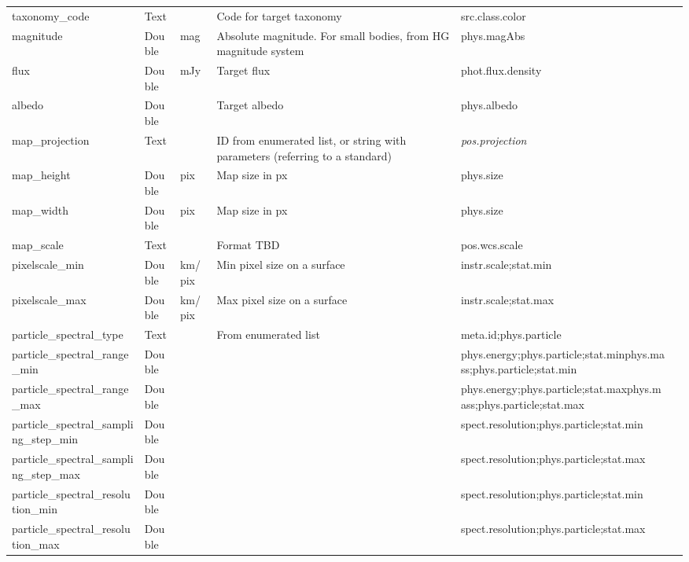 \documentclass[11pt,a4paper]{ivoa}
\begin{document}
\begin{landscape}
\begin{longtable}{p{3.5cm}p{0.5cm}p{1.4cm}p{1cm}p{7cm}p{5cm}}
taxonomy\_code&Text&&Code for target taxonomy&src.class.color&\\

magnitude&Double&mag&Absolute magnitude. For small bodies, from HG magnitude system&phys.magAbs&\\

flux&Double&mJy&Target flux&phot.flux.density&\\

albedo&Double&&Target albedo&phys.albedo&\\

map\_projection&Text&&ID from enumerated list, or string with parameters (referring to a standard)&\emph{pos.projection}&\\

map\_height&Double&pix&Map size in px&phys.size&\\

map\_width&Double&pix&Map size in px&phys.size&\\

map\_scale&Text&&Format TBD&pos.wcs.scale&\\

pixelscale\_min&Double&km/pix&Min pixel size on a surface&instr.scale;stat.min&\\

pixelscale\_max&Double&km/pix&Max pixel size on a surface&instr.scale;stat.max&\\

particle\_spectral\_type&Text&&From enumerated list&meta.id;phys.particle&\\

particle\_spectral\_range\_min&Double&&&phys.energy;phys.particle;stat.minphys.mass;phys.particle;stat.min&\\

particle\_spectral\_range\_max&Double&&&phys.energy;phys.particle;stat.maxphys.mass;phys.particle;stat.max&\\

particle\_spectral\_sampling\_step\_min&Double&&&spect.resolution;phys.particle;stat.min &\\

particle\_spectral\_sampling\_step\_max&Double&&&spect.resolution;phys.particle;stat.max &\\

particle\_spectral\_resolution\_min&Double&&&spect.resolution;phys.particle;stat.min &\\

particle\_spectral\_resolution\_max&Double&&&spect.resolution;phys.particle;stat.max &\\


\end{longtable}
\end{landscape}
\end{document}
